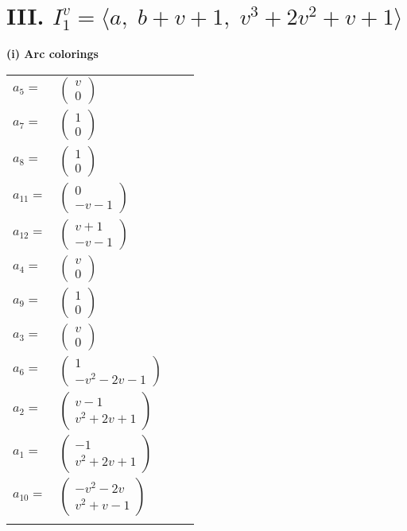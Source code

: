 \documentclass[1p]{elsarticle_modified}
\theoremstyle{definition}
\begin{document}
\centering \section*{III. $I^v_{1}= \langle a,\;b+v+1,\;v^3+2 v^2+v+1 \rangle$}
\flushleft \textbf{(i) Arc colorings}\\
\begin{tabular}{m{7pt} m{180pt} m{7pt} m{180pt} }
\flushright $a_{5}=$&$\begin{pmatrix}v\\0\end{pmatrix}$ \\
\flushright $a_{7}=$&$\begin{pmatrix}1\\0\end{pmatrix}$ \\
\flushright $a_{8}=$&$\begin{pmatrix}1\\0\end{pmatrix}$ \\
\flushright $a_{11}=$&$\begin{pmatrix}0\\- v-1\end{pmatrix}$ \\
\flushright $a_{12}=$&$\begin{pmatrix}v+1\\- v-1\end{pmatrix}$ \\
\flushright $a_{4}=$&$\begin{pmatrix}v\\0\end{pmatrix}$ \\
\flushright $a_{9}=$&$\begin{pmatrix}1\\0\end{pmatrix}$ \\
\flushright $a_{3}=$&$\begin{pmatrix}v\\0\end{pmatrix}$ \\
\flushright $a_{6}=$&$\begin{pmatrix}1\\- v^2-2 v-1\end{pmatrix}$ \\
\flushright $a_{2}=$&$\begin{pmatrix}v-1\\v^2+2 v+1\end{pmatrix}$ \\
\flushright $a_{1}=$&$\begin{pmatrix}-1\\v^2+2 v+1\end{pmatrix}$ \\
\flushright $a_{10}=$&$\begin{pmatrix}- v^2-2 v\\v^2+v-1\end{pmatrix}$\\&\end{tabular}
\end{document}
